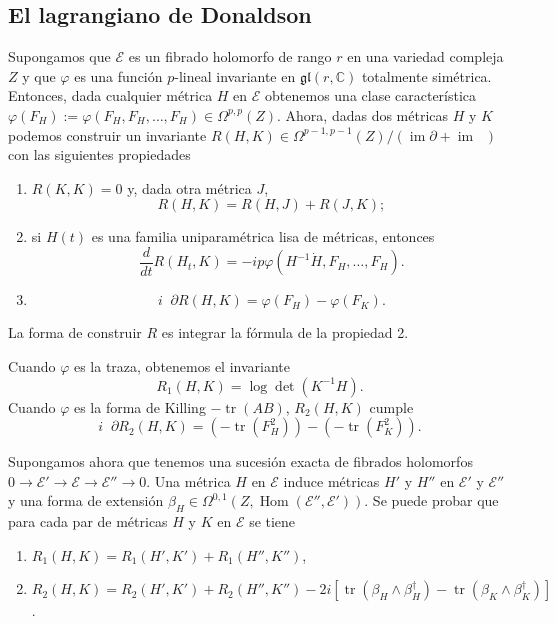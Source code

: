 \documentclass[12pt, a4paper]{amsart}
\newcommand\CC{\mathbb{C}}
\newcommand\EE{\mathscr{E}}
\DeclareMathOperator\tr{tr}
\DeclareMathOperator\im{im}
\DeclareMathOperator\Hom{Hom}
\DeclareMathOperator\delbar{\bar{\partial}}
\theoremstyle{remark} \newtheorem{rmk}[thm]{Observación}
\theoremstyle{remark} \newtheorem{rmks}[thm]{Observaciones}
\theoremstyle{definition} \newtheorem{defn}[thm]{Definición}
\theoremstyle{definition} \newtheorem{ejs}[thm]{Ejemplos}
\theoremstyle{definition} \newtheorem{ej}[thm]{Ejemplo}
\begin{document}
\subsection{El lagrangiano de Donaldson} Supongamos que $\EE$ es un fibrado holomorfo de rango $r$ en una variedad compleja $Z$ y que $\varphi$ es una función $p$-lineal invariante en $\mathfrak{gl}(r,\CC)$ totalmente simétrica. Entonces, dada cualquier métrica $H$ en $\EE$ obtenemos una clase característica $\varphi(F_H):=\varphi(F_H,F_H,\dots,F_H) \in \Omega^{p,p}(Z)$.
Ahora, dadas dos métricas $H$ y $K$ podemos construir un invariante $R(H,K)\in \Omega^{p-1,p-1}(Z)/(\im \partial + \im \delbar)$ con las siguientes propiedades
\begin{enumerate}
	\item $R(K,K)=0$ y, dada otra métrica $J$,
		\begin{equation*}
			R(H,K)=R(H,J)+R(J,K);
		\end{equation*} 
	\item si $H(t)$ es una familia uniparamétrica lisa de métricas, entonces
		 \begin{equation*}
			 \frac{d}{dt} R(H_t,K)=-ip\varphi(H^{-1}\dot{H},F_H,\dots,F_H).
		\end{equation*} 
	\item 
		\begin{equation*}
			i\delbar \partial R(H,K)=\varphi(F_H)-\varphi(F_K).
		\end{equation*} 
\end{enumerate}
La forma de construir $R$ es integrar la fórmula de la propiedad 2.

Cuando $\varphi$ es la traza, obtenemos el invariante
 \begin{equation*}
	 R_1(H,K)=\log \det (K^{-1}H).
\end{equation*} 
Cuando $\varphi$ es la forma de Killing $-\tr(AB)$, $R_2(H,K)$ cumple
\begin{equation*}
	i\delbar \partial R_2(H,K) = (-\tr(F_H^2))-(-\tr(F_K^2)).
\end{equation*} 

Supongamos ahora que tenemos una sucesión exacta de fibrados holomorfos $0\rightarrow \EE'\rightarrow \EE \rightarrow \EE'' \rightarrow 0$. Una métrica $H$ en $\EE$ induce métricas $H'$ y $H''$ en $\EE'$ y $\EE''$ y una forma de extensión  $\beta_H \in \Omega^{0,1}(Z,\Hom(\EE'',\EE'))$. Se puede probar que para cada par de métricas $H$ y $K$ en $\EE$ se tiene
\begin{enumerate}
	\item $R_1(H,K)=R_1(H',K')+R_1(H'',K'')$,
\item $R_2(H,K)=R_2(H',K')+R_2(H'',K'')-2i[\tr(\beta_H\wedge \beta_H^\dagger)-\tr(\beta_K \wedge \beta_K^\dagger)]$.
\end{enumerate}
\end{document}
